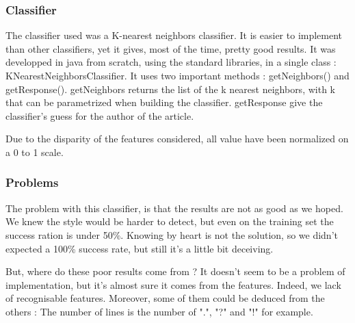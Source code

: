 \subsubsection{Classifier}

The classifier used was a K-nearest neighbors classifier. It is easier to implement than other classifiers, yet it gives, most of the time, pretty good results.
It was developped in java from scratch, using the standard libraries, in a single class : KNearestNeighborsClassifier. It uses two important methods : getNeighbors() and getResponse().
getNeighbors returns the list of the k nearest neighbors, with k that can be parametrized when building the classifier.
getResponse give the classifier's guess for the author of the article.

Due to the disparity of the features considered, all value have been normalized on a 0 to 1 scale.


\subsubsection{Problems}
The problem with this classifier, is that the results are not as good as we hoped. We knew the style would be harder to detect, but even on the training set the success ration is under 50\%. Knowing by heart is not the solution, so we didn't expected a 100\% success rate, but still it's a little bit deceiving. 

But, where do these poor results come from ? It doesn't seem to be a problem of implementation, but it's almost sure it comes from the features. Indeed, we lack of recognisable features. Moreover, some of them could be deduced from the others : The number of lines is the number of ".", "?" and "!" for example.